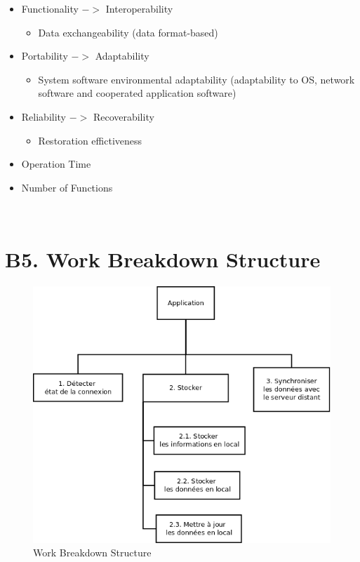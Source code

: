 	\begin{itemize}
		\item Functionality $->$ Interoperability
			\begin{itemize}
				\item Data exchangeability (data format-based)
			\end{itemize}
		\item Portability $->$ Adaptability
			\begin{itemize}
				\item System software environmental adaptability (adaptability to OS, network software and cooperated application software)
			\end{itemize}
		\item Reliability $->$ Recoverability
			\begin{itemize}
				\item Restoration effictiveness
			\end{itemize}
		\item Operation Time
		\item Number of Functions
	\end{itemize}
	~\\

\section{B5. Work Breakdown Structure}

 \begin{figure}[h!]
  \centering
  \includegraphics[width=18cm]{./images/wbs.png}
  \caption{Work Breakdown Structure}
 \end{figure}
